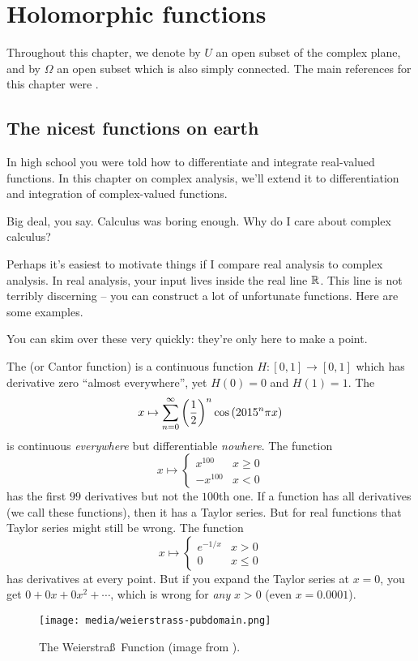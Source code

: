 \chapter{Holomorphic functions}
Throughout this chapter, we denote by $U$ an open subset of the complex plane,
and by $\Omega$ an open subset which is also simply connected.
The main references for this chapter were \cite{ref:dartmouth,ref:bak_ca}.

\section{The nicest functions on earth}
In high school you were told how to differentiate and integrate real-valued functions.
In this chapter on complex analysis,
we'll extend it to differentiation and integration of complex-valued functions.

Big deal, you say. Calculus was boring enough. Why do I care about complex calculus?

Perhaps it's easiest to motivate things if I compare real analysis to complex analysis.
In real analysis, your input lives inside the real line $\mathbb R$.
This line is not terribly discerning -- you can construct a lot of unfortunate functions.
Here are some examples.
\begin{example}
	You can skim over these very quickly: they're only here to make a point.
	\begin{enumerate}[(a)]
		\ii The  (or Cantor function)
		is a continuous function $H \colon [0,1] \to [0,1]$
		which has derivative zero ``almost everywhere'',
		yet $H(0) = 0$ and $H(1) = 1$.
		\ii The 
		\[ x \mapsto \sum_{n=0}^\infty \left( \frac{1}{2} \right)^n \cos \left( 2015^n \pi x \right) \]
		is continuous \emph{everywhere} but differentiable \emph{nowhere}.
		\ii The function
		\[
			x \mapsto
			\begin{cases}
				x^{100} & x \ge 0 \\
				-x^{100} & x < 0
			\end{cases}
		\]
		has the first $99$ derivatives but not the $100$th one.
		\ii
		If a function has all derivatives (we call these  functions),
		then it has a Taylor series.
		But for real functions that Taylor series might still be wrong. The function
		\[ x \mapsto
			\begin{cases}
				e^{-1/x} & x > 0 \\
				0 & x \le 0
			\end{cases}
		\]
		has derivatives at every point.
		But if you expand the Taylor series at $x=0$, you get $0 + 0x + 0x^2 + \cdots$,
		which is wrong for \emph{any} $x > 0$ (even $x=0.0001$).
	\end{enumerate}
\end{example}
\begin{figure}[h]
	\centering
	\texttt{[image: media/weierstrass-pubdomain.png]}
	\caption{The Weierstra\ss\ Function (image from \cite{img:weierstrass}).}
\end{figure}

